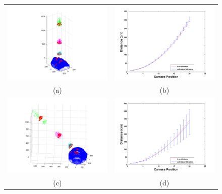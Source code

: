 \documentclass[runningheads]{llncs}
\begin{document}
\begin{figure}[ht!]
\begin{tabular}{cc}
\includegraphics[width=.5\linewidth]{resources/figures/cameraloc_frontal.png} &
\includegraphics[width=.5\linewidth]{resources/figures/errorbar_frontal.png} \\
(a) & (b) \\
\includegraphics[width=.5\linewidth]{resources/figures/cameraloc_3q.png} &
\includegraphics[width=.5\linewidth]{resources/figures/errorbar_3q.png} \\
(c) & (d)

\end{tabular}
\end{figure}
\end{document}
